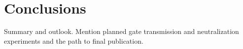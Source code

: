\section{Conclusions}
\label{sec:conclusions}

Summary and outlook. Mention planned gate transmission and neutralization experiments and the path to final publication.
